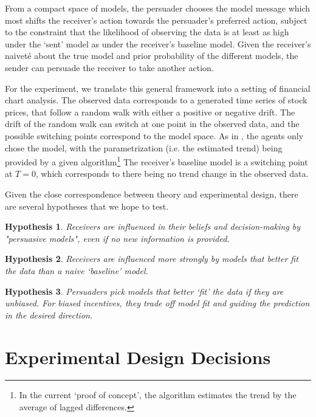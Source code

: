 \documentclass[11pt, a4paper, leqno]{article}
\newtheorem{hypothesis}{Hypothesis}
\begin{document}
From a compact space of models, the persuader chooses the model message which most shifts the receiver's action towards the persuader's preferred action, subject to the constraint that the likelihood of observing the data is at least as high under the `sent' model as under the receiver's baseline model. Given the receiver's naiveté about the true model and prior probability of the different models, the sender can persuade the receiver to take another action.

For the experiment, we translate this general framework into a setting of financial chart analysis. The observed data corresponds to a generated time series of stock prices, that follow a random walk with either a positive or negative drift. The drift of the random walk can switch at one point in the observed data, and the possible switching points correspond to the model space. As in \cite{Schwartzstein}, the agents only chose the model, with the parametrization (i.e. the estimated trend)  being provided by a given algorithm\footnote{In the current `proof of concept', the algorithm estimates the trend by the average of lagged differences.} The receiver's baseline model is a switching point at $T=0$, which corresponds to there being no trend change in the observed data.

Given the close correspondence between theory and experimental design, there are several hypotheses that we hope to test.




\begin{hypothesis}
Receivers are influenced in their beliefs and decision-making by "persuasive models", even if no new information is provided.
\end{hypothesis}

\begin{hypothesis}
Receivers are influenced more strongly by models that better fit the data than a naive `baseline' model. 
\end{hypothesis}

\begin{hypothesis}
Persuaders pick models that better `fit' the data if they are unbiased. For biased incentives, they trade off model fit and guiding the prediction in the desired direction.
\end{hypothesis}




\section{Experimental Design Decisions}
\end{document}
